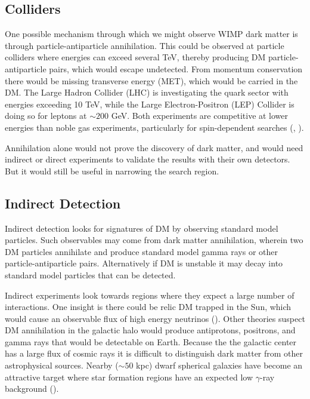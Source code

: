\subsection{Colliders} \label{subsec:colliders}
One possible mechanism through which we might observe WIMP dark matter is through particle-antiparticle
annihilation.  This could be observed at particle colliders where energies can exceed
several TeV, thereby producing DM particle-antiparticle pairs, which
would escape undetected.  From momentum conservation there would be missing transverse energy (MET),
which would be carried in the DM.  The Large Hadron Collider (LHC) is investigating the quark sector with energies
exceeding 10 TeV, while the Large Electron-Positron (LEP) Collider is doing so for leptons at
$\sim 200$ GeV.  Both experiments are competitive at lower energies than noble gas experiments, particularly
for spin-dependent searches (, ).

Annihilation alone would not prove the discovery of dark matter, and would need
indirect or direct experiments to validate the results with their own detectors.  But
it would still be useful in narrowing the search region.


\subsection{Indirect Detection} \label{subsec:indirect}
Indirect detection looks for signatures of DM by observing standard model particles.  Such observables
may come from dark matter annihilation, wherein two DM particles annihilate and produce standard model
gamma rays or other particle-antiparticle pairs.  Alternatively if DM is unstable it may decay into
standard model particles that can be detected.

Indirect experiments look towards regions where they expect a large number of interactions.  One insight is
there could be relic DM trapped in the Sun, which would cause an observable flux of high energy
neutrinos ().  Other theories suspect DM annihilation in the galactic halo would produce
antiprotons, positrons, and gamma rays that would be detectable on Earth.  Because the the galactic center
has a large flux of cosmic rays it is difficult to distinguish dark matter from other astrophysical
sources.  Nearby ($\sim 50$ kpc) dwarf spherical
galaxies have become an attractive target where star formation regions have an expected low $\gamma$-ray
background ().

